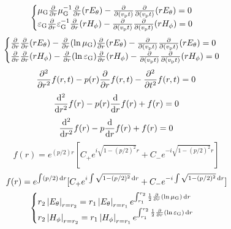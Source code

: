 \begin{equation}
    \begin{cases}
        \mu_{\text{G}}\frac{\partial}{\partial r}\mu_{\text{G}}^{-1}\frac{\partial}{\partial r}(r{E}_\theta)-\frac{\partial}{\partial(v_\text{p}t)}\frac{\partial}{\partial(v_\text{p}t)}(r{E}_\theta)=0\\
        \varepsilon_{\text{G}}\frac{\partial}{\partial r}\varepsilon_{\text{G}}^{-1}\frac{\partial}{\partial r}(r{H}_\phi)-\frac{\partial}{\partial(v_\text{p}t)}\frac{\partial}{\partial(v_\text{p}t)}(r{H}_\phi)=0\\
    \end{cases}
\end{equation}
\begin{equation}
    \begin{cases}
        \frac{\partial}{\partial r}\frac{\partial}{\partial r}(r{E}_\theta)-\frac{\partial}{\partial r}(\ln\mu_{\text{G}})\frac{\partial}{\partial r}(r{E}_\theta)-\frac{\partial}{\partial(v_\text{p}t)}\frac{\partial}{\partial(v_\text{p}t)}(r{E}_\theta)=0\\
        \frac{\partial}{\partial r}\frac{\partial}{\partial r}(r{H}_\phi)-\frac{\partial}{\partial r}(\ln\varepsilon_{\text{G}})\frac{\partial}{\partial r}(r{H}_\phi)-\frac{\partial}{\partial(v_\text{p}t)}\frac{\partial}{\partial(v_\text{p}t)}(r{H}_\phi)=0\\
    \end{cases}
\end{equation}
\begin{equation}
    \frac{\partial^2}{\partial r^2}f(r,t)-p(r)\frac{\partial}{\partial r}f(r,t)-\frac{\partial^2}{\partial t^2}f(r,t)=0
\end{equation}
\begin{equation}
    \frac{\mathrm{d}^2}{\mathrm{d} r^2}f(r)-p(r)\frac{\mathrm{d}}{\mathrm{d} r}f(r)+f(r)=0
\end{equation}
\begin{equation}
    \frac{\mathrm{d}^2}{\mathrm{d} r^2}f(r)-p\frac{\mathrm{d}}{\mathrm{d} r}f(r)+f(r)=0
\end{equation}
\begin{equation}
    f(r)=e^{(p/2)r}[C_+e^{i\sqrt{1-(p/2)^2}r}+C_-e^{-i\sqrt{1-(p/2)^2}r}]
\end{equation}
\begin{equation}
    f(r)=e^{\int(p/2)\,\mathrm{d} r}[C_+e^{i\int\sqrt{1-(p/2)^2}\,\mathrm{d} r}+C_-e^{-i\int\sqrt{1-(p/2)^2}\,\mathrm{d} r}]
\end{equation}
\begin{equation}
    \begin{cases}
        r_2\left\lvert {E}_\theta\right\rvert_{r=r_2}=r_1\left\lvert {E}_\theta\right\rvert_{r=r_1}e^{\int_{r_1}^{r_2}\frac{1}{2}\frac{\partial}{\partial r}(\ln\mu_{\text{G}})\,\mathrm{d} r}\\
        r_2\left\lvert {H}_\phi\right\rvert_{r=r_2}=r_1\left\lvert {H}_\phi\right\rvert_{r=r_1}e^{\int_{r_1}^{r_2}\frac{1}{2}\frac{\partial}{\partial r}(\ln\varepsilon_{\text{G}})\,\mathrm{d} r}
    \end{cases}
\end{equation}
